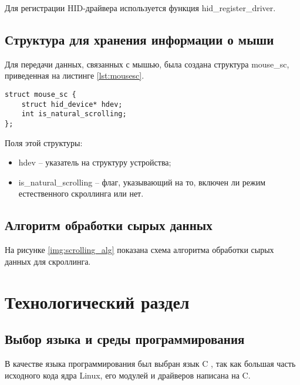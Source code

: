 \documentclass{bmstu}
\begin{document}
Для регистрации HID-драйвера используется функция hid\_register\_driver.


\section{Структура для хранения информации о мыши}

Для передачи данных, связанных с мышью, была создана структура mouse\_sc,
приведенная на листинге \ref{lst:mousesc}.

\begin{lstlisting}[caption={Структура mouse\_sc}, label=lst:mousesc]
struct mouse_sc {
    struct hid_device* hdev;
    int is_natural_scrolling;
};
\end{lstlisting}

Поля этой структуры:

\begin{itemize}
	\item hdev -- указатель на структуру устройства;
	\item is\_natural\_scrolling -- флаг, указывающий на то, включен ли режим естественного скроллинга или нет.
\end{itemize}

\section{Алгоритм обработки сырых данных}
На рисунке \ref{img:scrolling_alg} показана схема алгоритма обработки сырых данных для скроллинга.

\clearpage


\chapter{Технологический раздел}


\section{Выбор языка и среды программирования}

В качестве языка программирования был выбран язык C \cite{c}, так как большая часть
исходного кода ядра Linux, его модулей и драйверов написана на C.
\end{document}
